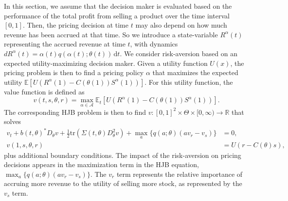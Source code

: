 \documentclass[main.tex]{subfiles}
\begin{document}
In this section, we assume that the decision maker is evaluated based on
the performance of the total profit from selling a product over the
time interval $[0,1]$. Then, the pricing decision at time $t$ may also depend
on how much revenue has been accrued at that time. So we
introduce a state-variable $R^\alpha(t)$ representing the accrued
revenue at time $t$, with dynamics
$dR^\alpha(t)=\alpha(t)q(\alpha(t);\theta(t))\,\mathrm{d}t$.
We consider risk-aversion based on
an expected utility-maximizing decision maker.
Given a utility function $U(x)$, the pricing problem is then to
find a pricing policy $\alpha$ that maximizes the expected utility
$\mathbb E[U(R^\alpha(1)-C(\theta(1))S^\alpha(1))]$.
For this utility function, the value function is defined as
\begin{equation}
  v(t,s,\theta,r)=
  \max_{\alpha\in\mathcal A}
  \mathbb E_t\left[
    U\left(R^\alpha(1)-C(\theta(1))S^\alpha(1)\right)
  \right].
\end{equation}
The corresponding HJB problem is then to find
$v:{[0,1]}^2\times \Theta\times{[0,\infty)}\to\mathbb R$ that solves
\begin{align}\label{eq:hjb_utility}
  v_t+{b(t,\theta)}^* D_\theta v
  + {\textstyle\frac{1}{2}}\mbox{tr}\left( \Sigma(t,\theta)
  D_\theta^2v \right)
  +\max_{a}\{q(a;\theta)(av_r-v_s)\}&=0,\\
  v(1,s,\theta,r) &= U(r-C(\theta)s),
\end{align}
plus additional boundary conditions. The impact of the risk-aversion
on pricing decisions appears in the maximization term in the HJB
equation, $\max_a\{q(a;\theta)(av_r-v_s)\}$. The $v_r$ term represents
the relative importance of accruing more revenue to the utility of
selling more stock, as represented by the $v_s$ term.
\end{document}
